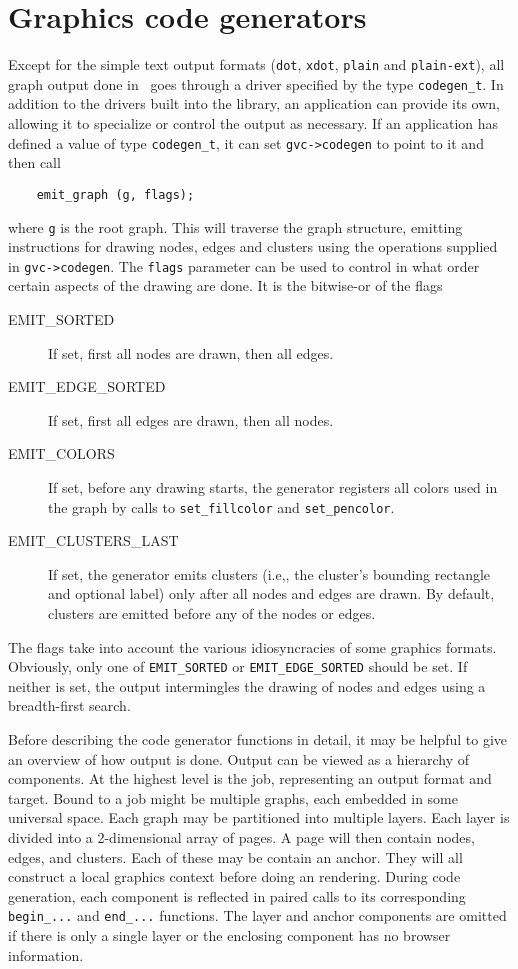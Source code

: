 \section{Graphics code generators}
\label{sec:codegen}

Except for the simple text output formats ({\tt dot}, 
{\tt xdot}, {\tt plain} and {\tt plain-ext}),
all graph output done in \gviz\ goes through a driver specified
by the type {\tt codegen\_t}.
In addition to the drivers built into the library, an application
can provide its own, allowing it to specialize or control the output
as necessary. If an application has defined a value of type
{\tt codegen\_t}, it can set {\tt gvc->codegen} to point to it
and then call
\begin{verbatim}
    emit_graph (g, flags);
\end{verbatim}
where {\tt g} is the root graph. This will traverse the graph structure,
emitting instructions for drawing nodes, edges and clusters using the
operations supplied in {\tt gvc->codegen}. The {\tt flags} parameter 
can be used to control in what order certain aspects of the
drawing are done. It is the bitwise-or of the flags
\begin{description}
\item[EMIT\_SORTED] If set, first all nodes are drawn, then all edges.
\item[EMIT\_EDGE\_SORTED] If set, first all edges are drawn, then all nodes.
\item[EMIT\_COLORS] If set, before any drawing starts, the generator
registers all colors used in the graph by calls to {\tt set\_fillcolor} and
{\tt set\_pencolor}.
\item[EMIT\_CLUSTERS\_LAST] If set, the generator emits clusters (i.e,,
the cluster's bounding rectangle and optional label) only after all
nodes and edges are drawn. By default, clusters are emitted before
any of the nodes or edges.
\end{description}
The flags take into account the various idiosyncracies of some
graphics formats. Obviously, only one of {\tt EMIT\_SORTED} or
{\tt EMIT\_EDGE\_SORTED} should be set. If neither is set,
the output intermingles the drawing of nodes and edges using
a breadth-first search.

Before describing the code generator functions in detail, it may be helpful
to give an overview of how output is done. Output can be viewed as a hierarchy
of components. At the highest level is the job, representing 
an output format and target. Bound to a job might be multiple graphs,
each embedded in some universal space. Each graph may be partitioned
into multiple layers. Each layer is divided into a 2-dimensional array
of pages. A page will then contain nodes, edges, and clusters. Each of
these may be contain an anchor. They will all construct a local graphics
context before doing an rendering. During code generation, each component
is reflected in paired calls to its corresponding {\tt begin\_...} and
{\tt end\_...} functions. The layer and anchor components are omitted if
there is only a single layer or the enclosing component has no browser
information. 


